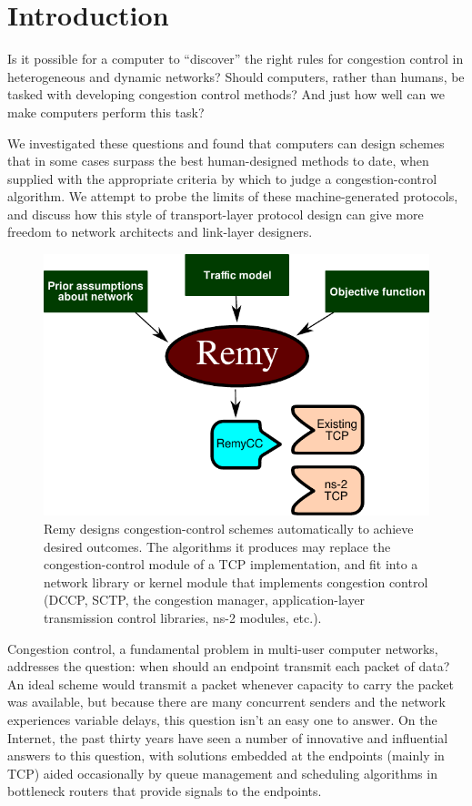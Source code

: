 \section{Introduction}
\label{remy:intro}

Is it possible for a computer to ``discover'' the right rules for
congestion control in heterogeneous and dynamic networks? Should
computers, rather than humans, be tasked with developing congestion
control methods?  And just how well can we make computers perform this
task?

We investigated these questions and found that computers can design
schemes that in some cases surpass the best human-designed methods to
date, when supplied with the appropriate criteria by which to
judge a congestion-control algorithm. We attempt to probe the limits
of these machine-generated protocols, and discuss how this style of
transport-layer protocol design can give more freedom to network
architects and link-layer designers.

\begin{figure}
\vspace{\baselineskip}
\begin{centering}
\includegraphics[width=0.75 \columnwidth]{remy.pdf}
\caption{Remy designs congestion-control schemes automatically to
  achieve desired outcomes. The algorithms it produces may replace
the congestion-control module of a TCP implementation, and fit into
a network library or kernel module that implements congestion
control (DCCP, SCTP, the congestion manager, application-layer
transmission control libraries, ns-2 modules, etc.).}

\end{centering}

\end{figure}

Congestion control, a fundamental problem in multi-user computer
networks, addresses the question: when should an endpoint transmit
each packet of data? An ideal scheme would transmit a packet whenever
capacity to carry the packet was available, but because there are many
concurrent senders and the network experiences variable delays, this
question isn't an easy one to answer. On the Internet, the past thirty
years have seen a number of innovative and influential answers to this
question, with solutions embedded at the endpoints (mainly in TCP)
aided occasionally by queue management and scheduling algorithms in
bottleneck routers that provide signals to the endpoints.

